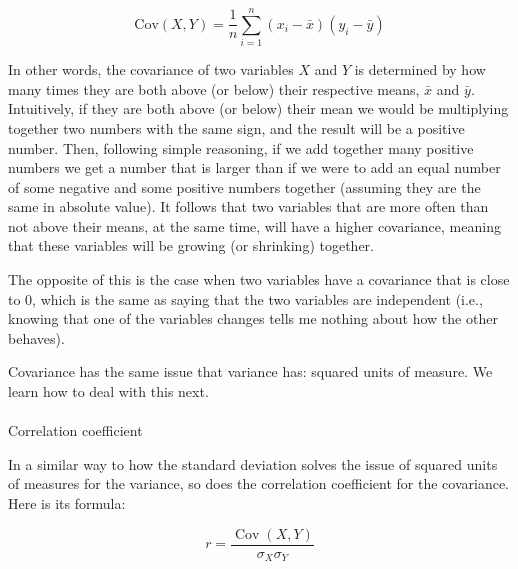 \documentclass[
  letterpaper,
  DIV=11,
  numbers=noendperiod]{scrartcl}
\makeatletter
\let\oldparagraph\paragraph
\renewcommand{\paragraph}{
    \@ifstar
      \xxxParagraphStar
      \xxxParagraphNoStar
  }
\newcommand{\xxxParagraphStar}[1]{\oldparagraph*{#1}\mbox{}}
\newcommand{\xxxParagraphNoStar}[1]{\oldparagraph{#1}\mbox{}}
\makeatother
\begin{document}
\[
\text{Cov}(X, Y) = \frac{1}{n} \sum_{i=1}^{n} (x_i - \bar{x})(y_i - \bar{y})
\]

In other words, the covariance of two variables \(X\) and \(Y\) is
determined by how many times they are both above (or below) their
respective means, \(\bar{x}\) and \(\bar{y}\). Intuitively, if they are
both above (or below) their mean we would be multiplying together two
numbers with the same sign, and the result will be a positive number.
Then, following simple reasoning, if we add together many positive
numbers we get a number that is larger than if we were to add an equal
number of some negative and some positive numbers together (assuming
they are the same in absolute value). It follows that two variables that
are more often than not above their means, at the same time, will have a
higher covariance, meaning that these variables will be growing (or
shrinking) together.

The opposite of this is the case when two variables have a covariance
that is close to 0, which is the same as saying that the two variables
are independent (i.e., knowing that one of the variables changes tells
me nothing about how the other behaves).

\begin{tcolorbox}[enhanced jigsaw, colbacktitle=quarto-callout-caution-color!10!white, bottomtitle=1mm, colframe=quarto-callout-caution-color-frame, leftrule=.75mm, rightrule=.15mm, titlerule=0mm, opacityback=0, toptitle=1mm, bottomrule=.15mm, left=2mm, arc=.35mm, title=\textcolor{quarto-callout-caution-color}{\faFire}\hspace{0.5em}{Caution}, toprule=.15mm, opacitybacktitle=0.6, colback=white, breakable, coltitle=black]

Covariance has the same issue that variance has: squared units of
measure. We learn how to deal with this next.

\end{tcolorbox}

\paragraph{Correlation coefficient}\label{correlation-coefficient}

In a similar way to how the standard deviation solves the issue of
squared units of measures for the variance, so does the correlation
coefficient for the covariance. Here is its formula:

\[
r = \frac{\operatorname{Cov}(X, Y)}{\sigma_X \sigma_Y}
\]
\end{document}
